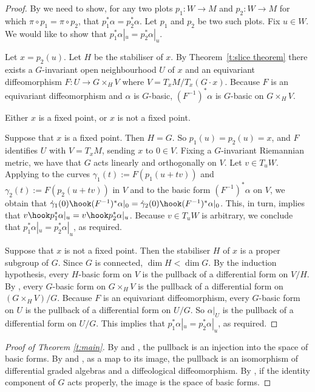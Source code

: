 \begin{proof}
By  we need to show,
for any two plots $p_1 \colon W \to M$
and $p_2 \colon W\to M$ for which $\pi \circ p_1 = \pi \circ p_2$,
that $p_1^* \alpha = p_2^* \alpha$.
Let $p_1$ and $p_2$ be two such plots.
Fix $u\in W$. We would like to show that $p_1^*\alpha|_u = p_2^*\alpha|_u$.

Let $x = p_2(u)$. Let $H$ be the stabiliser of $x$.
By Theorem~\ref{t:slice theorem} %
there exists
a $G$-invariant open neighbourhood $U$ of $x$ and an equivariant
dif\/feomorphism $F \colon U \to G \times_H V$
where $V = T_xM / T_x(G \cdot x)$.
Because $F$ is an equivariant dif\/feomorphism and $\alpha$ is $G$-basic,
$(F^{-1})^* \alpha$ is $G$-basic on $G \times_H V$.

Either $x$ is a f\/ixed point, or $x$ is not a f\/ixed point.

Suppose that $x$ is a f\/ixed point. Then $H=G$.
So $p_1(u) = p_2(u) = x$, and $F$ identif\/ies $U$ with $V = T_xM$,
sending $x$ to $0 \in V$.
Fixing a $G$-invariant Riemannian metric, we have
that $G$ acts linearly and orthogonally on $V$. Let $v \in T_uW$. Applying  to the curves
$\gamma_1(t) := F(p_1(u+tv))$ and $\gamma_2(t) := F(p_2(u+tv))$ in $V$
and to the basic form $(F^{-1})^*\alpha$ on $V$,
we obtain that $\dot{\gamma}_1(0) \hook (F^{-1})^*\alpha|_0
 = \dot{\gamma}_2(0) \hook (F^{-1})^*\alpha|_0$.
This, in turn, implies that $v \hook p_1^*\alpha|_u = v \hook p_2^* \alpha|_u$.
Because $v \in T_uW$ is arbitrary, we conclude
that $p_1^*\alpha|_u = p_2^*\alpha|_u$, as required.

Suppose that $x$ is not a f\/ixed point.
Then the stabiliser $H$ of $x$ is a proper subgroup of $G$.
Since $G$ is connected, $\dim H < \dim G$.
By the induction hypothesis, every $H$-basic form on $V$
is the pullback of a dif\/ferential form on $V/H$.
By ,
every $G$-basic form on $G \times_H V$
is the pullback of a dif\/ferential form on $(G \times_H V)/G$.
Because $F$ is an equivariant dif\/feomorphism,
every $G$-basic form on $U$
is the pullback of a dif\/ferential form on $U/G$.
So $\alpha|_U$ is the pullback of a dif\/ferential form on $U/G$.
This implies that $p_1^* \alpha|_u = p_2^* \alpha|_u$, as required.
\end{proof}

\begin{proof}[Proof of Theorem \ref{t:main}]
By 
and ,
the pullback is an injection into the space of basic forms.
By  and ,
as a map to its image,
the pullback is an isomorphism of dif\/ferential graded algebras
and a dif\/feological dif\/feomorphism.
By , if the identity component of $G$
acts properly, the image is the space of basic forms.
\end{proof}
